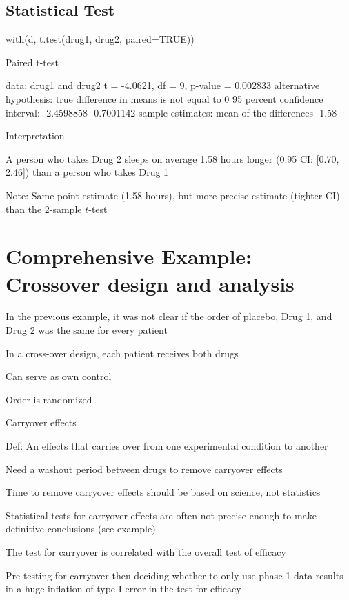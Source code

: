 \subsection{Statistical Test}
\begin{Schunk}
\begin{Sinput}
with(d, t.test(drug1, drug2, paired=TRUE))
\end{Sinput}
\begin{Soutput}

	Paired t-test

data:  drug1 and drug2
t = -4.0621, df = 9, p-value = 0.002833
alternative hypothesis: true difference in means is not equal to 0
95 percent confidence interval:
 -2.4598858 -0.7001142
sample estimates:
mean of the differences 
                  -1.58 
\end{Soutput}
\end{Schunk}
\bi
\item Interpretation
 \bi
 \item A person who takes Drug 2 sleeps on average 1.58 hours longer (0.95 CI: [0.70, 2.46]) than a person who takes Drug 1
 \ei
\item Note: Same point estimate (1.58 hours), but more precise estimate (tighter CI) than the 2-sample $t$-test
\ei

\clearpage
\section{Comprehensive Example: Crossover design and analysis}
\bi
 \item In the previous example, it was not clear if the order of placebo, Drug 1, and Drug 2 was the same for every patient
 \item In a cross-over design, each patient receives both drugs
   \bi
     \item Can serve as own control
     \item Order is randomized
   \ei
 \item Carryover effects
   \bi
      \item Def: An effects that carries over from one experimental condition to another
      \item Need a washout period between drugs to remove carryover effects
      \item Time to remove carryover effects should be based on science, not statistics
      \item Statistical tests for carryover effects are often not
        precise enough to make definitive conclusions (see example) 
      \item The test for carryover is correlated with the overall
        test of efficacy
      \item Pre-testing for carryover then deciding whether to only
        use phase 1 data results in a huge inflation of type I error
        in the test for efficacy
   \ei
\ei

